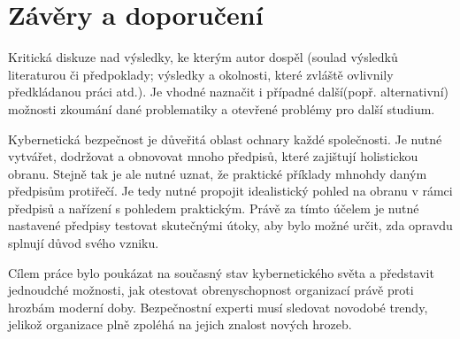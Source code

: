 
\section{Závěry a doporučení}\label{sec:zavery-a-doporuceni}


Kritická diskuze nad výsledky, ke kterým autor dospěl (soulad výsledků literaturou či předpoklady;
výsledky a okolnosti, které zvláště ovlivnily předkládanou práci atd.).
Je vhodné naznačit i případné další(popř. alternativní) možnosti zkoumání dané problematiky a otevřené problémy pro další studium.


Kybernetická bezpečnost je důveřitá oblast ochnary každé společnosti.
Je nutné vytvářet, dodržovat a obnovovat mnoho předpisů, které zajištují holistickou obranu.
Stejně tak je ale nutné uznat, že praktické příklady mhnohdy daným předpisům protiřečí.
Je tedy nutné propojit idealistický pohled na obranu v rámci předpisů a nařízení s pohledem praktickým.
Právě za tímto účelem je nutné nastavené předpisy testovat skutečnými útoky, aby bylo možné určit, zda opravdu splnují důvod svého vzniku.

Cílem práce bylo poukázat na současný stav kybernetického světa a představit jednoudché možnosti, jak otestovat obrenyschopnost organizací právě proti hrozbám moderní doby.%
Bezpečnostní experti musí sledovat novodobé trendy, jelikož organizace plně zpoléhá na jejich znalost nových hrozeb.

